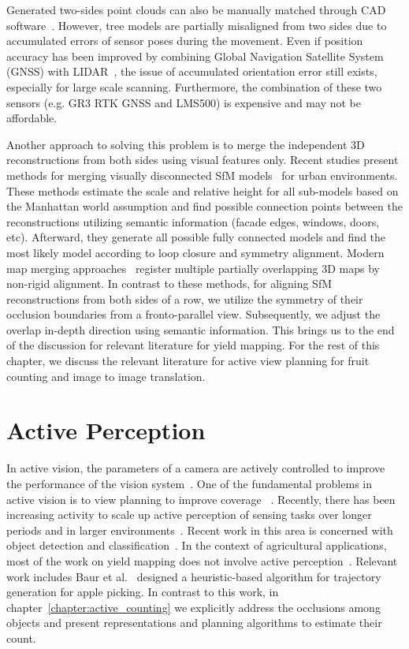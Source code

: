  Generated two-sides point clouds can also be manually matched through CAD software~\cite{rosell2009obtaining}. However, tree models are partially misaligned from two sides due to accumulated errors of sensor poses during the movement. Even if position accuracy has been improved by combining Global Navigation Satellite System (GNSS) with LIDAR~\cite{del2015georeferenced}, the issue of accumulated orientation error still exists, especially for large scale scanning. Furthermore, the combination of these two sensors (e.g. GR3 RTK GNSS and LMS500) is expensive and may not be affordable.
 
 
 Another approach to solving this problem is to merge the independent 3D reconstructions from both sides using visual features only. Recent studies present methods for merging visually disconnected SfM models~\cite{cohen2016indoor} for urban environments. These methods estimate the scale and relative height for all sub-models based on the Manhattan world assumption and find possible connection points between the reconstructions utilizing semantic information (facade edges, windows, doors, etc). Afterward, they generate all possible fully connected models and find the most likely model according to loop closure and symmetry alignment. Modern map merging approaches~\cite{zhou2016fast,bonanni20173} register multiple partially overlapping 3D maps by non-rigid alignment. In contrast to these methods, for aligning SfM reconstructions from both sides of a row, we utilize the symmetry of their occlusion boundaries from a fronto-parallel view. Subsequently, we adjust the overlap in-depth direction using semantic information. This brings us to the end of the discussion for relevant literature for yield mapping. For the rest of this chapter, we discuss the relevant literature for active view planning for fruit counting and image to image translation.

\section{Active Perception}\label{sec:relwork_active}
In active vision, the parameters of a camera are actively controlled to improve the performance of the vision system~\cite{bajcsy1988active}. One of the fundamental problems in active vision is to view planning to improve coverage ~\cite{scott2003view}. Recently, there has been increasing activity to scale up active perception of sensing tasks over longer periods and in larger environments~\cite{bajcsy2016revisiting}. Recent work in this area is concerned with object detection and classification~\cite{atanasov2014nonmyopic,potthast2014probabilistic,pattenmonte}. 
In the context of agricultural applications, most of the work on yield mapping does not involve active perception~\cite{hung2015feature, wang, das2015devices, deepApple, roy2016counting, roy2016surveying, peng2016semantic}. Relevant work includes Baur et al.~\cite{baur2014path} designed a heuristic-based algorithm for trajectory generation for apple picking. In contrast to this work, in chapter~\ref{chapter:active_counting} we explicitly address the occlusions among objects and present representations and planning algorithms to estimate their count.




